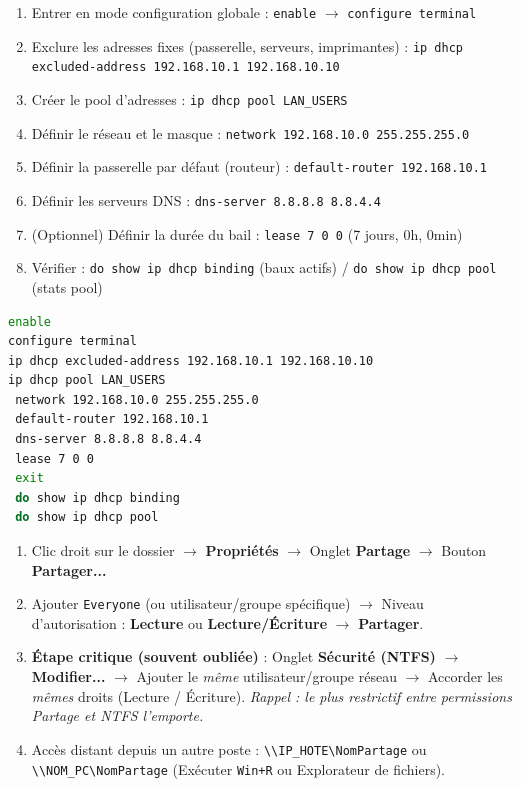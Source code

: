 \documentclass[11pt]{article}
\begin{document}
\begin{aretenir}
\begin{methode}
\begin{enumerate}
    \item Entrer en mode configuration globale : \texttt{enable} $\rightarrow$ \texttt{configure terminal}
    \item Exclure les adresses fixes (passerelle, serveurs, imprimantes) : \texttt{ip dhcp excluded-address 192.168.10.1 192.168.10.10}
    \item Créer le pool d'adresses : \texttt{ip dhcp pool LAN\_USERS}
    \item Définir le réseau et le masque : \texttt{network 192.168.10.0 255.255.255.0}
    \item Définir la passerelle par défaut (routeur) : \texttt{default-router 192.168.10.1}
    \item Définir les serveurs DNS : \texttt{dns-server 8.8.8.8 8.8.4.4}
    \item (Optionnel) Définir la durée du bail : \texttt{lease 7 0 0} (7 jours, 0h, 0min)
    \item Vérifier : \texttt{do show ip dhcp binding} (baux actifs) / \texttt{do show ip dhcp pool} (stats pool)
\end{enumerate}
\begin{lstlisting}[language=bash, caption=Configuration DHCP Cisco IOS complète]
enable
configure terminal
ip dhcp excluded-address 192.168.10.1 192.168.10.10
ip dhcp pool LAN_USERS
 network 192.168.10.0 255.255.255.0
 default-router 192.168.10.1
 dns-server 8.8.8.8 8.8.4.4
 lease 7 0 0
 exit
 do show ip dhcp binding
 do show ip dhcp pool
\end{lstlisting}
\end{methode}

\begin{methode}
\begin{enumerate}
    \item Clic droit sur le dossier $\rightarrow$ \textbf{Propriétés} $\rightarrow$ Onglet \textbf{Partage} $\rightarrow$ Bouton \textbf{Partager...}
    \item Ajouter \texttt{Everyone} (ou utilisateur/groupe spécifique) $\rightarrow$ Niveau d'autorisation : \textbf{Lecture} ou \textbf{Lecture/Écriture} $\rightarrow$ \textbf{Partager}.
    \item \textbf{Étape critique (souvent oubliée)} : Onglet \textbf{Sécurité (NTFS)} $\rightarrow$ \textbf{Modifier...} $\rightarrow$ Ajouter le \emph{même} utilisateur/groupe réseau $\rightarrow$ Accorder les \emph{mêmes} droits (Lecture / Écriture). \emph{Rappel : le plus restrictif entre permissions Partage et NTFS l'emporte.}
    \item Accès distant depuis un autre poste : \texttt{\textbackslash\textbackslash IP\_HOTE\textbackslash NomPartage} ou \texttt{\textbackslash\textbackslash NOM\_PC\textbackslash NomPartage} (Exécuter \texttt{Win+R} ou Explorateur de fichiers).
\end{enumerate}
\end{methode}


\end{aretenir}
\end{document}

